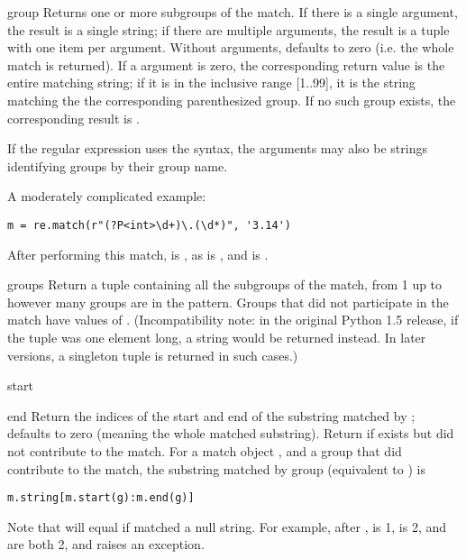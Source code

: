 \begin{funcdesc}{group}{}
Returns one or more subgroups of the match.  If there is a single
argument, the result is a single string; if there are
multiple arguments, the result is a tuple with one item per argument.
Without arguments,  defaults to zero (i.e. the whole match
is returned).
If a  argument is zero, the corresponding return value is the
entire matching string; if it is in the inclusive range [1..99], it is
the string matching the the corresponding parenthesized group.  If no
such group exists, the corresponding result is
.

If the regular expression uses the  syntax,
the  arguments may also be strings identifying groups by
their group name.

A moderately complicated example:

\begin{verbatim}
m = re.match(r"(?P<int>\d+)\.(\d*)", '3.14')
\end{verbatim}

After performing this match,  is , as is
, and  is .
\end{funcdesc}

\begin{funcdesc}{groups}{}
Return a tuple containing all the subgroups of the match, from 1 up to
however many groups are in the pattern.  Groups that did not
participate in the match have values of .  (Incompatibility 
note: in the original Python 1.5 release, if the tuple was one element
long, a string would be returned instead.  In later versions, a
singleton tuple is returned in such cases.)
\end{funcdesc}

\begin{funcdesc}{start}{}
\end{funcdesc}

\begin{funcdesc}{end}{}
Return the indices of the start and end of the substring
matched by ;  defaults to zero (meaning the whole
matched substring).
Return  if  exists but
did not contribute to the match.  For a match object
, and a group  that did contribute to the match, the
substring matched by group  (equivalent to
) is

\begin{verbatim}
m.string[m.start(g):m.end(g)]
\end{verbatim}

Note that
 will equal  if
 matched a null string.  For example, after ,  is 1,
 is 2,  and
 are both 2, and  raises
an  exception.

\end{funcdesc}

